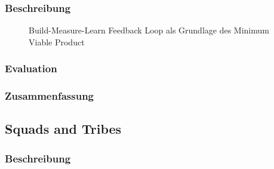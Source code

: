 \subsubsection{Beschreibung}


\begin{figure}[H]
	\centering
	\caption[Build-Measure-Learn Feedback Loop als Grundlage des Minimum Viable Product]{Build-Measure-Learn Feedback Loop als Grundlage des Minimum Viable Product \protect \cite[S. 103]{grote_fuhrungsinstrumente_2018}}
	\label{fig:mvploop}
\end{figure}

\todots

\subsubsection{Evaluation}

\todots

\subsubsection{Zusammenfassung}

\todots

\subsection{Squads and Tribes}

\subsubsection{Beschreibung}

